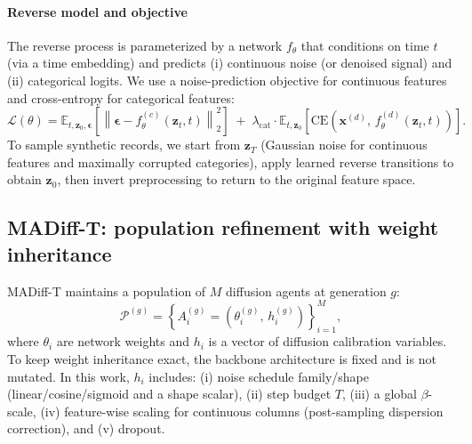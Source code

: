 \documentclass[preprint,12pt]{elsarticle}
\begin{document}
\paragraph{Reverse model and objective}
The reverse process is parameterized by a network $f_{\theta}$ that conditions on time $t$ (via a time embedding) and predicts (i) continuous noise (or denoised signal) and (ii) categorical logits. We use a noise-prediction objective for continuous features and cross-entropy for categorical features:
\begin{equation}
\mathcal{L}(\theta)=
\mathbb{E}_{t,\mathbf{z}_0,\boldsymbol{\epsilon}}\left[\left\|\boldsymbol{\epsilon}-f_{\theta}^{(c)}(\mathbf{z}_t,t)\right\|_2^2\right]
\;+\;
\lambda_{\text{cat}} \cdot
\mathbb{E}_{t,\mathbf{z}_0}\left[\mathrm{CE}\!\left(\mathbf{x}^{(d)},\, f_{\theta}^{(d)}(\mathbf{z}_t,t)\right)\right].
\label{eq:diff_loss}
\end{equation}
To sample synthetic records, we start from $\mathbf{z}_T$ (Gaussian noise for continuous features and maximally corrupted categories), apply learned reverse transitions to obtain $\mathbf{z}_0$, then invert preprocessing to return to the original feature space.

\subsection{MADiff-T: population refinement with weight inheritance}
MADiff-T maintains a population of $M$ diffusion agents at generation $g$:
\begin{equation}
\mathcal{P}^{(g)}=\left\{A_i^{(g)}=(\theta_i^{(g)},\, h_i^{(g)})\right\}_{i=1}^{M},
\end{equation}
where $\theta_i$ are network weights and $h_i$ is a vector of diffusion calibration variables. To keep weight inheritance exact, the backbone architecture is fixed and is not mutated. In this work, $h_i$ includes: (i) noise schedule family/shape (linear/cosine/sigmoid and a shape scalar), (ii) step budget $T$, (iii) a global $\beta$-scale, (iv) feature-wise scaling for continuous columns (post-sampling dispersion correction), and (v) dropout.
\end{document}
